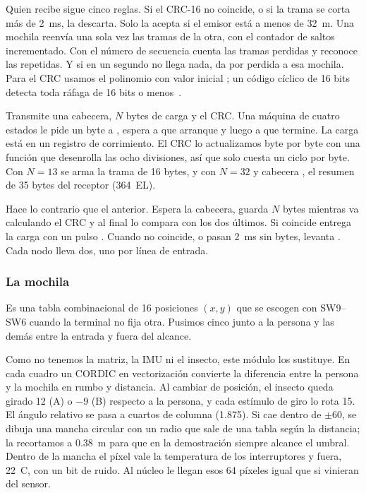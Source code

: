 Quien recibe sigue cinco reglas. Si el CRC-16 no coincide, o si la trama se corta más de 2~ms, la descarta. Solo la acepta si el
emisor está a menos de 32~m. Una mochila reenvía una sola vez las tramas de la otra, con el contador de saltos incrementado. Con
el número de secuencia cuenta las tramas perdidas y reconoce las repetidas. Y si en un segundo no llega nada, da por perdida a esa
mochila. Para el CRC usamos el polinomio  con valor inicial ; un código cíclico de 16 bits detecta toda
ráfaga de 16 bits o menos~\cite{peterson1961}.

Transmite una cabecera, $N$ bytes de carga y el CRC. Una máquina de cuatro estados le pide un byte a , espera a que
arranque y luego a que termine. La carga está en un registro de corrimiento. El CRC lo actualizamos byte por byte con una función
que desenrolla las ocho divisiones, así que solo cuesta un ciclo por byte. Con $N=13$ se arma la trama de 16 bytes, y con $N=32$ y
cabecera , el resumen de 35 bytes del receptor (364~EL).

Hace lo contrario que el anterior. Espera la cabecera, guarda $N$ bytes mientras va calculando el CRC y al final lo compara con los
dos últimos. Si coincide entrega la carga con un pulso . Cuando no coincide, o pasan 2~ms sin bytes, levanta . Cada nodo
lleva dos, uno por línea de entrada.

\subsubsection{La mochila}

Es una tabla combinacional de 16 posiciones $(x,y)$ que se escogen con SW9--SW6 cuando la terminal no fija otra. Pusimos cinco junto
a la persona y las demás entre la entrada y fuera del alcance.

Como no tenemos la matriz, la IMU ni el insecto, este módulo los sustituye. En cada cuadro un CORDIC en vectorización convierte la
diferencia entre la persona y la mochila en rumbo y distancia. Al cambiar de posición, el insecto queda girado 12\textdegree{} (A) o
$-9$\textdegree{} (B) respecto a la persona, y cada estímulo de giro lo rota 15\textdegree. El ángulo relativo se pasa a cuartos de
columna (1.875\textdegree). Si cae dentro de $\pm60$\textdegree, se dibuja una mancha circular con un radio que sale de una tabla según
la distancia; la recortamos a 0.38~m para que en la demostración siempre alcance el umbral. Dentro de la mancha el píxel vale la
temperatura de los interruptores y fuera, 22~\textdegree C, con un bit de ruido. Al núcleo le llegan esos 64 píxeles igual que si
vinieran del sensor.

